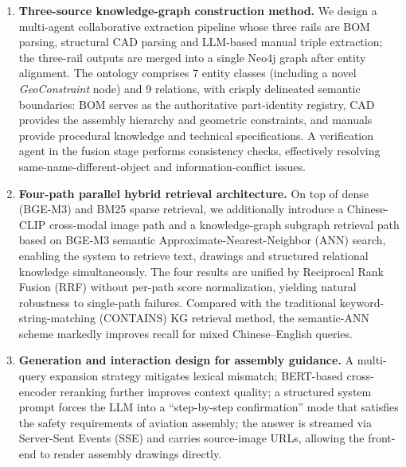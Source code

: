\documentclass[applsci,article,submit,pdftex,moreauthors]{Definitions/mdpi}
\begin{document}
\begin{enumerate}
\item \textbf{Three-source knowledge-graph construction method.} We design a multi-agent collaborative extraction pipeline whose three rails are BOM parsing, structural CAD parsing and LLM-based manual triple extraction; the three-rail outputs are merged into a single Neo4j graph after entity alignment. The ontology comprises 7 entity classes (including a novel \textit{GeoConstraint} node) and 9 relations, with crisply delineated semantic boundaries: BOM serves as the authoritative part-identity registry, CAD provides the assembly hierarchy and geometric constraints, and manuals provide procedural knowledge and technical specifications. A verification agent in the fusion stage performs consistency checks, effectively resolving same-name-different-object and information-conflict issues.

\item \textbf{Four-path parallel hybrid retrieval architecture.} On top of dense (BGE-M3) and BM25 sparse retrieval, we additionally introduce a Chinese-CLIP cross-modal image path and a knowledge-graph subgraph retrieval path based on BGE-M3 semantic Approximate-Nearest-Neighbor (ANN) search, enabling the system to retrieve text, drawings and structured relational knowledge simultaneously. The four results are unified by Reciprocal Rank Fusion (RRF) without per-path score normalization, yielding natural robustness to single-path failures. Compared with the traditional keyword-string-matching (CONTAINS) KG retrieval method, the semantic-ANN scheme markedly improves recall for mixed Chinese--English queries.

\item \textbf{Generation and interaction design for assembly guidance.} A multi-query expansion strategy mitigates lexical mismatch; BERT-based cross-encoder reranking further improves context quality; a structured system prompt forces the LLM into a ``step-by-step confirmation'' mode that satisfies the safety requirements of aviation assembly; the answer is streamed via Server-Sent Events (SSE) and carries source-image URLs, allowing the front-end to render assembly drawings directly.


\end{enumerate}
\end{document}
